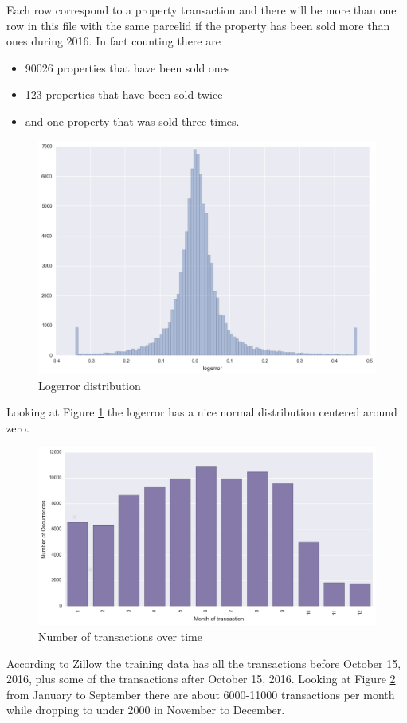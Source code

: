 \documentclass[a4paper]{article}
\begin{document}
Each row correspond to a property transaction and there will be more than one row in this file with the same
parcelid if the property has been sold more than ones during 2016. In fact counting there are
\begin{itemize}
    \item 90026 properties that have been sold ones
    \item 123 properties that have been sold twice
    \item and one property that was sold three times.
\end{itemize}

\begin{figure}
\centering
\includegraphics[width=1\textwidth]{./img/train-logerror.png}
\caption{\label{fig:logerror}Logerror distribution}
\end{figure}
Looking at Figure \ref{fig:logerror} the logerror has a nice normal distribution centered around zero.

\begin{figure}
\centering
\includegraphics[width=1\textwidth]{./img/train-transactiondate.png}
\caption{\label{fig:transactions}Number of transactions over time}
\end{figure}
According to Zillow the training data has all the transactions before October 15, 2016, plus some of the transactions
after October 15, 2016. Looking at Figure \ref{fig:transactions} from January to September there are about 6000-11000
transactions per month while dropping to under 2000 in November to December.
\end{document}
